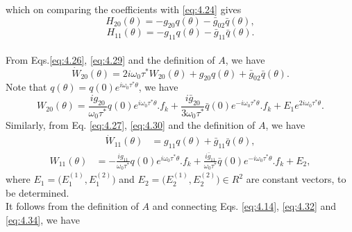 \documentclass[10pt]{amsart}
\theoremstyle{definition}
\begin{document}
 which on comparing the coefficients with \eqref{eq:4.24} gives\\
 \begin{equation}\label{eq:4.29}
  H_{20}(\theta)=-g_{20} q(\theta)-{\bar g}_{02} \bar q (\theta),
  \end{equation}
  \begin{equation}\label{eq:4.30}
  H_{11}(\theta)=-g_{11} q(\theta)-{\bar g}_{11} \bar q (\theta).
  \end{equation}
 \\
From Eqs.\eqref{eq:4.26}, \eqref{eq:4.29} and the definition of $A$, we have\\
\begin{equation}\label{eq:4.31}
{\dot W}_{20}(\theta)=2i\omega_0 \tau^* W_{20}(\theta)+g_{20}q(\theta)+{\bar g}_{02} {\bar q}(\theta).
\end{equation}
Note that $q(\theta)=q(0)e^{i\omega_0 \tau^* \theta}$, we have\\
\begin{equation}\label{eq:4.32}
W_{20}(\theta)=\frac{ig_{20}}{\omega_0 \tau^*} q(0)e^{i\omega_0 \tau^* \theta}.f_k+\frac{i {\bar g}_{20}}{3\omega_0 \tau^*} \bar q (0)e^{-i\omega_0 \tau^* \theta}.f_k
+E_1 e^{2i \omega_0 \tau^* \theta}.
\end{equation}
Similarly, from Eq. \eqref{eq:4.27}, \eqref{eq:4.30} and the definition of $A$, we have\\
\begin{align}\label{eq:4.33}
{\dot W}_{11}(\theta)&=g_{11}q(\theta)+{\bar g}_{11} {\bar q}(\theta),
\end{align}
\begin{align}\label{eq:4.34}
W_{11}(\theta)&=-\frac{ig_{11}}{\omega_0 \tau^*} q(0)e^{i\omega_0 \tau^* \theta}.f_k+\frac{i {\bar g}_{11}}{\omega_0 \tau^*} \bar q (0)e^{-i\omega_0 \tau^* \theta}.f_k+E_2,
\end{align}
where $E_1=\big(E^{(1)}_1,E^{(2)}_1\big)$ and $E_2=\big(E^{(1)}_2,E^{(2)}_2\big)\in R^2$ are constant vectors, to be determined.\\
It follows from the definition of $A$ and connecting Eqs. \eqref{eq:4.14},  \eqref{eq:4.32} and  \eqref{eq:4.34}, we have\\
\\
\end{document}
